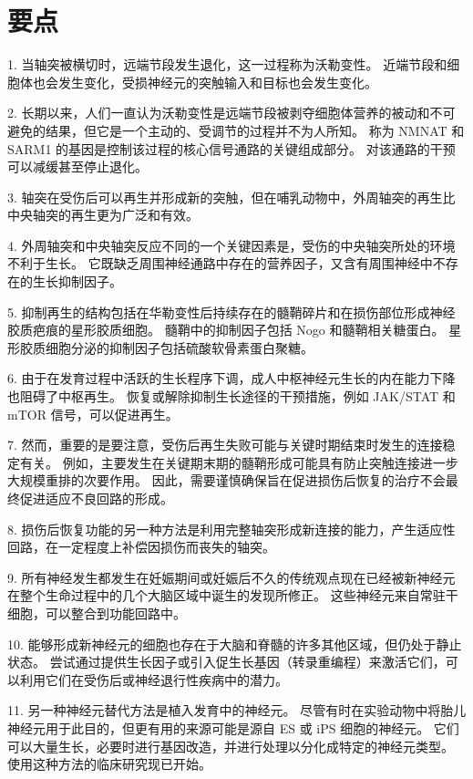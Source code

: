 \section{要点}

1. 当轴突被横切时，远端节段发生退化，这一过程称为沃勒变性。 近端节段和细胞体也会发生变化，受损神经元的突触输入和目标也会发生变化。 

2. 长期以来，人们一直认为沃勒变性是远端节段被剥夺细胞体营养的被动和不可避免的结果，但它是一个主动的、受调节的过程并不为人所知。 称为 NMNAT 和 SARM1 的基因是控制该过程的核心信号通路的关键组成部分。 对该通路的干预可以减缓甚至停止退化。 

3. 轴突在受伤后可以再生并形成新的突触，但在哺乳动物中，外周轴突的再生比中央轴突的再生更为广泛和有效。 

4. 外周轴突和中央轴突反应不同的一个关键因素是，受伤的中央轴突所处的环境不利于生长。 它既缺乏周围神经通路中存在的营养因子，又含有周围神经中不存在的生长抑制因子。 

5. 抑制再生的结构包括在华勒变性后持续存在的髓鞘碎片和在损伤部位形成神经胶质疤痕的星形胶质细胞。 髓鞘中的抑制因子包括 Nogo 和髓鞘相关糖蛋白。 星形胶质细胞分泌的抑制因子包括硫酸软骨素蛋白聚糖。 

6. 由于在发育过程中活跃的生长程序下调，成人中枢神经元生长的内在能力下降也阻碍了中枢再生。 恢复或解除抑制生长途径的干预措施，例如 JAK/STAT 和 mTOR 信号，可以促进再生。 

7. 然而，重要的是要注意，受伤后再生失败可能与关键时期结束时发生的连接稳定有关。 例如，主要发生在关键期末期的髓鞘形成可能具有防止突触连接进一步大规模重排的次要作用。 因此，需要谨慎确保旨在促进损伤后恢复的治疗不会最终促进适应不良回路的形成。 

8. 损伤后恢复功能的另一种方法是利用完整轴突形成新连接的能力，产生适应性回路，在一定程度上补偿因损伤而丧失的轴突。 

9. 所有神经发生都发生在妊娠期间或妊娠后不久的传统观点现在已经被新神经元在整个生命过程中的几个大脑区域中诞生的发现所修正。 这些神经元来自常驻干细胞，可以整合到功能回路中。 

10. 能够形成新神经元的细胞也存在于大脑和脊髓的许多其他区域，但仍处于静止状态。 尝试通过提供生长因子或引入促生长基因（转录重编程）来激活它们，可以利用它们在受伤后或神经退行性疾病中的潜力。 

11. 另一种神经元替代方法是植入发育中的神经元。 尽管有时在实验动物中将胎儿神经元用于此目的，但更有用的来源可能是源自 ES 或 iPS 细胞的神经元。 它们可以大量生长，必要时进行基因改造，并进行处理以分化成特定的神经元类型。 使用这种方法的临床研究现已开始。



